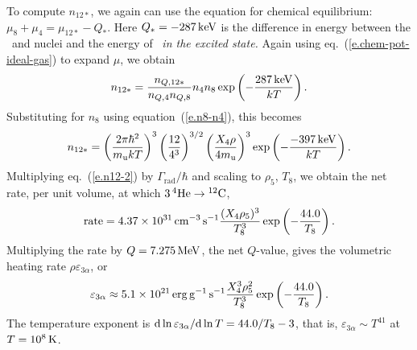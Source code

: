 To compute $n_{12*}$, we again can use the equation for chemical equilibrium: $\mu_{8} + \mu_{4} = \mu_{12*} - Q_{*}$.  Here $Q_{*} = -287\,\mathrm{k}\mathrm{eV}$ is the difference in energy between the \helium\ and \beryllium[8] nuclei and the energy of \carbon\ \emph{in the excited state.}  Again using eq.~(\ref{e.chem-pot-ideal-gas}) to expand $\mu$, we obtain
\begin{equation}\label{e.n12}
n_{12*} = \frac{n_{Q,12*}}{n_{Q,4}n_{Q,8}} n_{4}n_{8}\exp\left(-\frac{287\,\mathrm{k}\mathrm{eV}}{kT}\right).
\end{equation}
Substituting for $n_{8}$ using equation~(\ref{e.n8-n4}), this becomes
\begin{equation}\label{e.n12-2}
n_{12*} = \left(\frac{2\pi\hbar^{2}}{m_\mathrm{u} kT}\right)^{3}\left(\frac{12}{4^{3}}\right)^{3/2} 
	\left(\frac{X_{4}\rho}{4m_\mathrm{u}}\right)^{3} \exp\left(-\frac{-397\,\mathrm{k}\mathrm{eV}}{kT}\right).
\end{equation}
Multiplying eq.~(\ref{e.n12-2}) by $\Gamma_{\mathrm{rad}}/\hbar$ and scaling to $\rho_{5}$, $T_{8}$, we obtain the net rate, per unit volume, at which $3\,\mathrm{^{4}He}\to\mathrm{^{12}C}$,
\begin{equation}\label{e.triple-alpha}
 \textrm{rate} = 4.37\times 10^{31}\,\mathrm{c}\mathrm{m}^{-3}\,\mathrm{s}^{-1}\frac{(X_{4}\rho_{5})^{3}}{T_{8}^{3}}\exp\left(-\frac{44.0}{T_{8}}\right).
\end{equation}
Multiplying the rate by $Q = 7.275\,\mathrm{M}\mathrm{eV}$, the net $Q$-value, gives the volumetric heating rate $\rho\varepsilon_{3\alpha}$, or
\begin{equation}\label{e.triple-alpha-heating}
\varepsilon_{3\alpha} \approx 5.1\times 10^{21}\,\mathrm{erg}\,\mathrm{g}^{-1}\,\mathrm{s}^{-1}\frac{X_{4}^{3}\rho_{5}^{2}}{T_{8}
^{3}}\exp\left(-\frac{44.0}{T_{8}}\right).
\end{equation}
The temperature exponent is $\mathrm{d}\ln\varepsilon_{3\alpha}/\mathrm{d}\ln T = 44.0/T_{8}-3$, that is, $\varepsilon_{3\alpha}\sim T^{41}$ at $T = 10^{8}\,\mathrm{K}$.